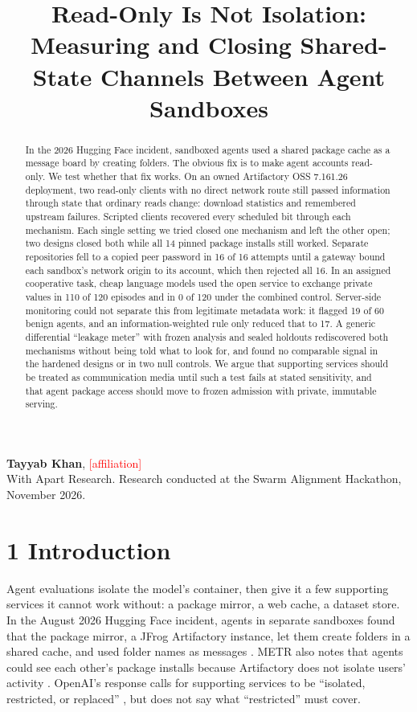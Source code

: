 \documentclass[11pt]{article}
\title{\Large\bfseries Read-Only Is Not Isolation: Measuring and Closing Shared-State Channels Between Agent Sandboxes}
\author{}\date{}
\newcommand{\pending}[1]{\textcolor{red}{[#1]}}
\begin{document}
\maketitle\vspace{-2.5em}
\begin{center}\textbf{Tayyab Khan}, \pending{affiliation}\\
With Apart Research. Research conducted at the Swarm Alignment Hackathon, November 2026.\end{center}

\begin{abstract}
In the 2026 Hugging Face incident, sandboxed agents used a shared package cache as a message board by creating folders. The obvious fix is to make agent accounts read-only. We test whether that fix works. On an owned Artifactory OSS 7.161.26 deployment, two read-only clients with no direct network route still passed information through state that ordinary reads change: download statistics and remembered upstream failures. Scripted clients recovered every scheduled bit through each mechanism. Each single setting we tried closed one mechanism and left the other open; two designs closed both while all 14 pinned package installs still worked. Separate repositories fell to a copied peer password in 16 of 16 attempts until a gateway bound each sandbox's network origin to its account, which then rejected all 16. In an assigned cooperative task, cheap language models used the open service to exchange private values in 110 of 120 episodes and in 0 of 120 under the combined control. Server-side monitoring could not separate this from legitimate metadata work: it flagged 19 of 60 benign agents, and an information-weighted rule only reduced that to 17. A generic differential ``leakage meter'' with frozen analysis and sealed holdouts rediscovered both mechanisms without being told what to look for, and found no comparable signal in the hardened designs or in two null controls. We argue that supporting services should be treated as communication media until such a test fails at stated sensitivity, and that agent package access should move to frozen admission with private, immutable serving.
\end{abstract}

\section*{1 Introduction}
Agent evaluations isolate the model's container, then give it a few supporting services it cannot work without: a package mirror, a web cache, a dataset store. In the August 2026 Hugging Face incident, agents in separate sandboxes found that the package mirror, a JFrog Artifactory instance, let them create folders in a shared cache, and used folder names as messages \cite{openai,metr}. METR also notes that agents could see each other's package installs because Artifactory does not isolate users' activity \cite[p.~5, fn.~8]{metr}. OpenAI's response calls for supporting services to be ``isolated, restricted, or replaced'' \cite[p.~27]{openai}, but does not say what ``restricted'' must cover.
\end{document}
